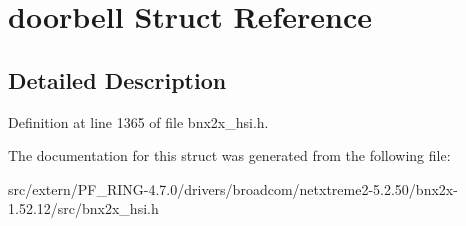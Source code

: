 \hypertarget{structdoorbell}{
\section{doorbell Struct Reference}
\label{structdoorbell}
}


\subsection{Detailed Description}


Definition at line 1365 of file bnx2x\_\-hsi.h.



The documentation for this struct was generated from the following file:\begin{DoxyCompactItemize}
\item 
src/extern/PF\_\-RING-\/4.7.0/drivers/broadcom/netxtreme2-\/5.2.50/bnx2x-\/1.52.12/src/bnx2x\_\-hsi.h\end{DoxyCompactItemize}
